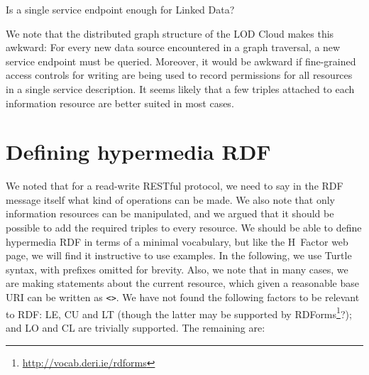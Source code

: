 \documentclass{llncs}
\begin{document}
\begin{question}
Is a single service endpoint enough for Linked Data?
\end{question}

We note that the distributed graph structure of the LOD Cloud makes
this awkward: For every new data source encountered in a graph
traversal, a new service endpoint must be queried. Moreover, it would
be awkward if fine-grained access controls for writing are being used
to record permissions for all resources in a single service
description. It seems likely that a few triples attached to each
information resource are better suited in most cases.

\section{Defining hypermedia RDF}

We noted that for a read-write RESTful protocol, we need to say in the
RDF message itself what kind of operations can be made. We also note
that only information resources can be manipulated, and we argued that
it should be possible to add the required triples to every
resource. We should be able to define hypermedia RDF in terms of a
minimal vocabulary, but like the H~Factor web page, we will find it
instructive to use examples. In the following, we use Turtle syntax,
with prefixes omitted for brevity. Also, we note that in many cases,
we are making statements about the current resource, which given a
reasonable base URI can be written as \texttt{<>}. We have not found
the following factors to be relevant to RDF: \textsf{LE}, \textsf{CU}
and \textsf{LT} (though the latter may be supported by
RDForms\footnote{\url{http://vocab.deri.ie/rdforms}}?); and
\textsf{LO} and \textsf{CL} are trivially supported. The remaining are:
\end{document}
